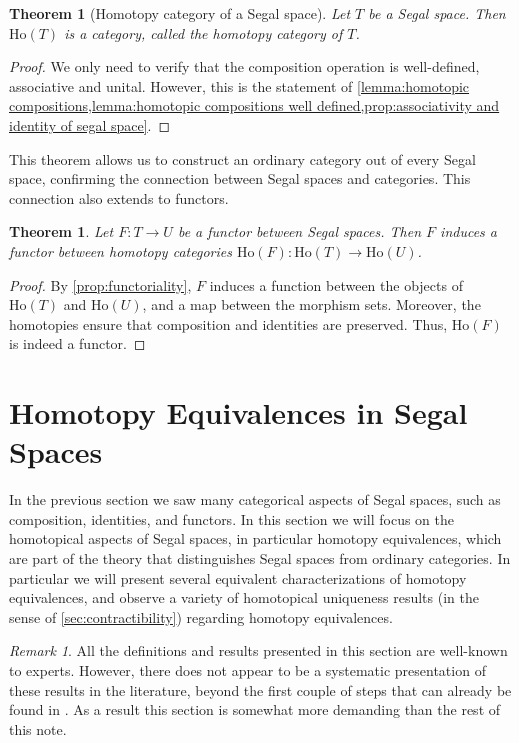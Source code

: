 \documentclass[11pt, a4paper]{amsart}
\newcommand{\Ho}{\mathrm{Ho}}
\newtheorem{theorem}[equation]{Theorem}
\theoremstyle{definition}
\theoremstyle{remark}
\newtheorem{remark}[equation]{Remark}
\numberwithin{equation}{section}
\begin{document}
\begin{theorem}[Homotopy category of a Segal space] \label{thm:homotopy category of segal space}
  Let $T$ be a Segal space. Then $\Ho(T)$ is a category, called the \emph{homotopy category} of $T$.
\end{theorem}

\begin{proof}
  We only need to verify that the composition operation is well-defined, associative and unital. However, this is the statement of \cref{lemma:homotopic compositions,lemma:homotopic compositions well defined,prop:associativity and identity of segal space}. 
\end{proof}

This theorem allows us to construct an ordinary category out of every Segal space, confirming the connection between Segal spaces and categories. This connection also extends to functors.

\begin{theorem}
  Let $F\colon T \to U$ be a functor between Segal spaces. Then $F$ induces a functor between homotopy categories $\Ho(F)\colon \Ho(T) \to \Ho(U)$.
\end{theorem}

\begin{proof}
  By \cref{prop:functoriality}, $F$ induces a function between the objects of $\Ho(T)$ and $\Ho(U)$, and a map between the morphism sets. Moreover, the homotopies ensure that composition and identities are preserved. Thus, $\Ho(F)$ is indeed a functor.
\end{proof}
 
\section{Homotopy Equivalences in Segal Spaces} \label{sec:homotopy equiv in Segal Spaces}
In the previous section we saw many categorical aspects of Segal spaces, such as composition, identities, and functors. In this section we will focus on the homotopical aspects of Segal spaces, in particular homotopy equivalences, which are part of the theory that distinguishes Segal spaces from ordinary categories. In particular we will present several equivalent characterizations of homotopy equivalences, and observe a variety of homotopical uniqueness results (in the sense of \cref{sec:contractibility}) regarding homotopy equivalences. 

\begin{remark}
  All the definitions and results presented in this section are well-known to experts. However, there does not appear to be a systematic presentation of these results in the literature, beyond the first couple of steps that can already be found in \cite{rezk2001css}. As a result this section is somewhat more demanding than the rest of this note.
\end{remark}
 
\end{document}
